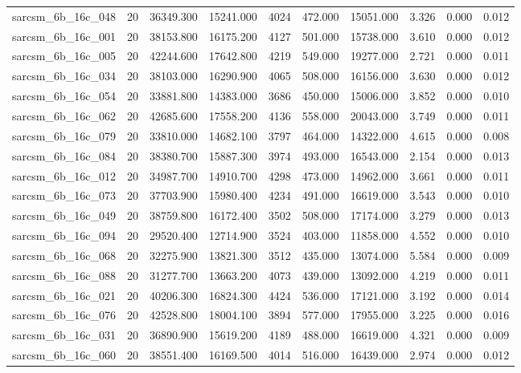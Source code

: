 \begin{tabular}{lrrrrrrrrr}
sarcsm\_6b\_16c\_048 & 20 & 36349.300 & 15241.000 & 4024 & 472.000 & 15051.000 & 3.326 & 0.000 & 0.012 \\
sarcsm\_6b\_16c\_001 & 20 & 38153.800 & 16175.200 & 4127 & 501.000 & 15738.000 & 3.610 & 0.000 & 0.012 \\
sarcsm\_6b\_16c\_005 & 20 & 42244.600 & 17642.800 & 4219 & 549.000 & 19277.000 & 2.721 & 0.000 & 0.011 \\
sarcsm\_6b\_16c\_034 & 20 & 38103.000 & 16290.900 & 4065 & 508.000 & 16156.000 & 3.630 & 0.000 & 0.012 \\
sarcsm\_6b\_16c\_054 & 20 & 33881.800 & 14383.000 & 3686 & 450.000 & 15006.000 & 3.852 & 0.000 & 0.010 \\
sarcsm\_6b\_16c\_062 & 20 & 42685.600 & 17558.200 & 4136 & 558.000 & 20043.000 & 3.749 & 0.000 & 0.011 \\
sarcsm\_6b\_16c\_079 & 20 & 33810.000 & 14682.100 & 3797 & 464.000 & 14322.000 & 4.615 & 0.000 & 0.008 \\
sarcsm\_6b\_16c\_084 & 20 & 38380.700 & 15887.300 & 3974 & 493.000 & 16543.000 & 2.154 & 0.000 & 0.013 \\
sarcsm\_6b\_16c\_012 & 20 & 34987.700 & 14910.700 & 4298 & 473.000 & 14962.000 & 3.661 & 0.000 & 0.011 \\
sarcsm\_6b\_16c\_073 & 20 & 37703.900 & 15980.400 & 4234 & 491.000 & 16619.000 & 3.543 & 0.000 & 0.010 \\
sarcsm\_6b\_16c\_049 & 20 & 38759.800 & 16172.400 & 3502 & 508.000 & 17174.000 & 3.279 & 0.000 & 0.013 \\
sarcsm\_6b\_16c\_094 & 20 & 29520.400 & 12714.900 & 3524 & 403.000 & 11858.000 & 4.552 & 0.000 & 0.010 \\
sarcsm\_6b\_16c\_068 & 20 & 32275.900 & 13821.300 & 3512 & 435.000 & 13074.000 & 5.584 & 0.000 & 0.009 \\
sarcsm\_6b\_16c\_088 & 20 & 31277.700 & 13663.200 & 4073 & 439.000 & 13092.000 & 4.219 & 0.000 & 0.011 \\
sarcsm\_6b\_16c\_021 & 20 & 40206.300 & 16824.300 & 4424 & 536.000 & 17121.000 & 3.192 & 0.000 & 0.014 \\
sarcsm\_6b\_16c\_076 & 20 & 42528.800 & 18004.100 & 3894 & 577.000 & 17955.000 & 3.225 & 0.000 & 0.016 \\
sarcsm\_6b\_16c\_031 & 20 & 36890.900 & 15619.200 & 4189 & 488.000 & 16619.000 & 4.321 & 0.000 & 0.009 \\
sarcsm\_6b\_16c\_060 & 20 & 38551.400 & 16169.500 & 4014 & 516.000 & 16439.000 & 2.974 & 0.000 & 0.012 \\

\end{tabular}
